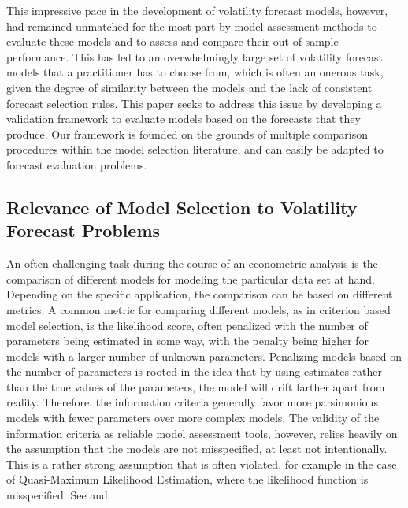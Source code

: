 \documentclass{article} %
\begin{document}
	This impressive pace in the development of volatility forecast models, however, had remained unmatched for the most part by model assessment methods to evaluate these models and to assess and compare their out-of-sample performance. This has led to an overwhelmingly large set of volatility forecast models that a practitioner has to choose from, which is often an onerous task, given the degree of similarity between the models and the lack of consistent forecast selection rules. This paper seeks to address this issue by developing a validation framework to evaluate models based on the forecasts that they produce. Our framework is founded on the grounds of multiple comparison procedures within the model selection literature, and can easily be adapted to forecast evaluation problems.
	
	\subsection{Relevance of Model Selection to Volatility Forecast Problems}
	 An often challenging task during the course of an econometric analysis is the comparison of different models for modeling the particular data set at hand. Depending on the specific application, the comparison can be based on different metrics. A common metric for comparing different models, as in criterion based model selection, is the likelihood score, often penalized with the number of parameters being estimated in some way, with the penalty being higher for models with a larger number of unknown parameters. Penalizing models based on the number of parameters is rooted in the idea that by using estimates rather than the true values of the parameters, the model will drift farther apart from reality. Therefore, the information criteria generally favor more parsimonious models with fewer parameters over more complex models. The validity of the information criteria as reliable model assessment tools, however, relies heavily on the assumption that the models are not misspecified, at least not intentionally. This is a rather strong assumption that is often violated, for example in the case of Quasi-Maximum Likelihood Estimation, where the likelihood function is misspecified. See \textcite{BOLLERSLEV19942959} and \textcite{SIN1996207}. 
	 
\end{document}
